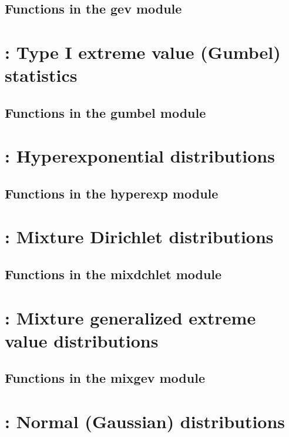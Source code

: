 \documentclass[10pt]{book}
\begin{document}
\subsection{Functions in the gev module}


\newpage
\section{: Type I extreme value (Gumbel) statistics}

\subsection{Functions in the gumbel module}


\newpage
\section{: Hyperexponential distributions}

\subsection{Functions in the hyperexp module}


\newpage
\section{: Mixture Dirichlet distributions}
%
\subsection{Functions in the mixdchlet module}
%

\newpage
\section{: Mixture generalized extreme value distributions}
%
\subsection{Functions in the mixgev module}


\newpage
\section{: Normal (Gaussian) distributions}

\end{document}
